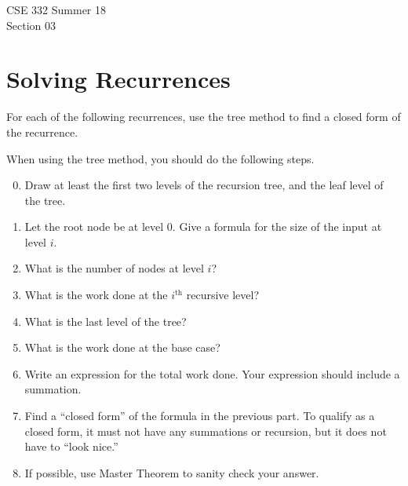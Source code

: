 \documentclass[12pt]{article}
\begin{document}
{\huge CSE 332 Summer 18\\
Section 03}
\section{Solving Recurrences}
For each of the following recurrences, use the tree method to find a closed form of the recurrence. 

When using the tree method, you should do the following steps.
\begin{enumerate}
	\setcounter{enumi}{-1}
	\item Draw at least the first two levels of the recursion tree, and the leaf level of the tree. 
	\item Let the root node be at level $0$. Give a formula for the size of the input at level $i$. 
	\item What is the number of nodes at level $i$? 
	\item What is the work done at the $i^{\text{th}}$ recursive level? 
	\item What is the last level of the tree? 
	\item What is the work done at the base case? 
	\item Write an expression for the total work done. Your expression should include a summation. 
	\item Find a ``closed form'' of the formula in the previous part. To qualify as a closed form, it must not have any summations or recursion, but it does not have to ``look nice.'' 
	\item If possible, use Master Theorem to sanity check your answer.
\end{enumerate}
\end{document}
